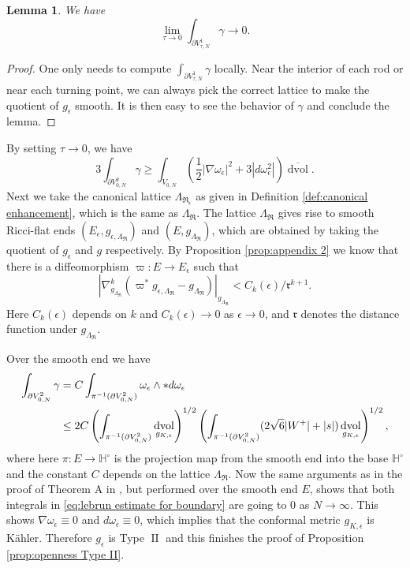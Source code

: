 \documentclass[a4paper,11pt]{amsart}
\newtheorem{lemma}[theorem]{Lemma}
\theoremstyle{definition}
\numberwithin{equation}{section}
\newcommand{\mR} {\mathfrak R}
\DeclareMathOperator{\dvol}{dvol}
\DeclareMathOperator{\II}{II}
\begin{document}
\begin{lemma} We have 
$$\lim_{\tau\rightarrow0}\int_{\partial V_{\tau,N}^1}\gamma\to0.$$    
\end{lemma}
\begin{proof}
    One only needs to compute $\int_{\partial V_{\tau,N}^1}\gamma$ locally. Near the interior of each rod or near each turning point, we can always pick the correct lattice to make the quotient of $g_{\epsilon}$ smooth. It is then easy to see the behavior of $\gamma$ and conclude the lemma.
\end{proof}
By setting $\tau\to0$, we have 
$$3\int_{\partial V_{0,N}^2}\gamma\geq \int_{V_{0,N}}(\frac{1}{2}|\nabla\omega_\epsilon|^2+3|d\omega_{\epsilon}^2|)\overline{\dvol}.$$
Next we take the canonical lattice $\Lambda_{\mR_\epsilon}$ as given in Definition \ref{def:canonical enhancement}, which is the same as $\Lambda_{\mR}$. The lattice $\Lambda_{\mR}$ gives rise to smooth Ricci-flat ends $(E_\epsilon,g_{\epsilon,\Lambda_{\mR}})$ and $(E,g_{\Lambda_{\mR}})$, which are obtained by taking the quotient of $g_{\epsilon}$ and $g$ respectively. By Proposition \ref{prop:appendix 2} we know that there is a diffeomorphism $\varpi:E\to E_\epsilon$ such that
     $$|\nabla_{g_{\Lambda_\mR}}^k(\varpi^*g_{\epsilon,\Lambda_\mR}-g_{\Lambda_\mR})|_{g_{\Lambda_\mR}}<C_k(\epsilon)/\mathfrak{r}^{k+1}.$$ 
     Here $C_k(\epsilon)$ depends on $k$ and  $C_k(\epsilon)\to0$ as $\epsilon\to0$, and $\mathfrak{r}$ denotes the distance function under $g_{\Lambda_\mR}$.




Over the smooth end we have
\begin{align}
    \int_{\partial V_{0,N}^2}\gamma&=C\int_{\pi^{-1}(\partial V_{0,N}^2)}\omega_{\epsilon}\wedge* d\omega_{\epsilon}\notag\\
    &\leq 2C\left(\int_{\pi^{-1}(\partial V_{0,N}^2)}\dvol_{g_{K,\epsilon}}\right)^{1/2}\left(\int_{\pi^{-1}(\partial V_{0,N}^2)}(2\sqrt{6}|W^+|+|s|)\dvol_{g_{K,\epsilon}}\right)^{1/2},\label{eq:lebrun estimate for boundary}
\end{align}
where here $\pi:E\to\mathbb{H}^\circ$ is the projection map from the smooth end into the base $\mathbb{H}^\circ$ and the constant $C$ depends on the lattice $\Lambda_{\mR}$. Now the same arguments as in the proof of Theorem A in \cite{BGL}, but performed over the smooth end $E$, shows that both integrals in \eqref{eq:lebrun estimate for boundary} are going to 0 as $N\to\infty$. This shows $\nabla\omega_{\epsilon}\equiv0$ and $d\omega_\epsilon\equiv0$, which implies that the conformal metric $g_{K,\epsilon}$ is K\"ahler. Therefore $g_\epsilon$ is Type $\II$ and this finishes the proof of Proposition \ref{prop:openness Type II}.
\end{document}
